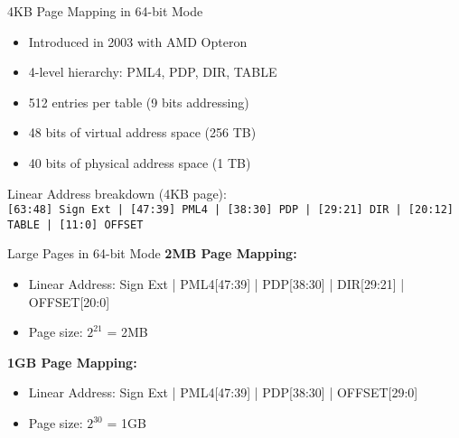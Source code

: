 \documentclass[aspectratio=169,12pt]{beamer}
\begin{document}
\begin{frame}{4KB Page Mapping in 64-bit Mode}
\begin{itemize}
    \item Introduced in 2003 with AMD Opteron
    \item 4-level hierarchy: PML4, PDP, DIR, TABLE
    \item 512 entries per table (9 bits addressing)
    \item 48 bits of virtual address space (256 TB)
    \item 40 bits of physical address space (1 TB)
\end{itemize}

\vspace{1em}
Linear Address breakdown (4KB page):\\
\texttt{[63:48] Sign Ext | [47:39] PML4 | [38:30] PDP | [29:21] DIR | [20:12] TABLE | [11:0] OFFSET}
\end{frame}

\begin{frame}{Large Pages in 64-bit Mode}
\textbf{2MB Page Mapping:}
\begin{itemize}
    \item Linear Address: Sign Ext | PML4[47:39] | PDP[38:30] | DIR[29:21] | OFFSET[20:0]
    \item Page size: $2^{21}$ = 2MB
\end{itemize}

\vspace{1em}
\textbf{1GB Page Mapping:}
\begin{itemize}
    \item Linear Address: Sign Ext | PML4[47:39] | PDP[38:30] | OFFSET[29:0]
    \item Page size: $2^{30}$ = 1GB
\end{itemize}
\end{frame}
\end{document}
